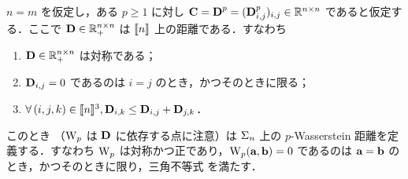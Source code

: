 \begin{prop}\label{prop-metric-histo}
$n=m$ を仮定し，ある $p \geq 1$ に対し $\C=\distD^p=(\distD_{i,j}^p)_{i,j} \in \RR^{n \times n}$ であると仮定する．ここで $\distD \in \RR_+^{n \times n}$ は $\range{n}$ 上の距離である．すなわち
\begin{enumerate}[label=(\roman*)]
	\item $\distD \in \RR_+^{n \times n}$ は対称である；
	\item $\distD_{i,j}=0$ であるのは $i=j$ のとき，かつそのときに限る；
	\item $\foralls (i,j,k) \in \range{n}^3, \distD_{i,k} \leq \distD_{i,j}+\distD_{j,k}$．
\end{enumerate}
このとき
（$\WassD_p$ は $\distD$ に依存する点に注意）は $\Si_n$ 上の $p$-Wasserstein 距離を定義する．すなわち $\WassD_p$ は対称かつ正であり，$\WassD_p(\a,\b)=0$ であるのは $\a = \b$ のとき，かつそのときに限り，三角不等式
を満たす．
\end{prop}

